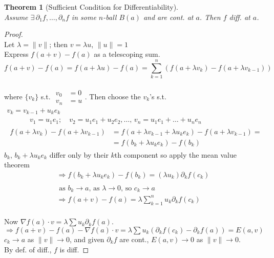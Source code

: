 \documentclass[twoside]{amsart}
\theoremstyle{plain}
\newtheorem{theorem}{Theorem}
\theoremstyle{definition}
\begin{document}
\begin{theorem}[Sufficient Condition for Differentiability] \quad \\
Assume $\exists \, \partial_1 f , \dots , \partial_n f$ in some $n$-ball $B(a)$ and are cont. at $a$.  Then $f$ diff. at $a$.  
\end{theorem}

\begin{proof} \quad \\
Let $\lambda = \| v \|$; then $v = \lambda u$, \quad $\| u \| = 1$ \\
Express $f(a+v) -f(a)$ as a telescoping sum.  
\[
f(a+v)-f(a) = f(a + \lambda u ) -f(a) = \sum_{k=1}^n \left( f(a+\lambda v_k) - f(a+\lambda v_{k-1}) \right) 
\]\quad \\
where $\{ v_k \}$ s.t. $\begin{aligned}
    v_0 & = 0 \\
    v_n & = u 
  \end{aligned}$.  Then choose the $v_k$'s s.t. 
\[
\begin{gathered}
  v_k = v_{k-1} + u_k e_k \\
 \quad \quad \quad \, v_1 = u_1 e_1; \quad v_2 = u_1 e_1 + u_2 e_2 , \dots , \, v_n = u_1 e_1 + \dots + u_n e_n  \\
  \begin{aligned}
f(a+\lambda v_k) - f(a+\lambda v_{k-1} )  & = f(a+ \lambda v_{k-1} + \lambda u_k e_k) - f(a+\lambda v_{k-1} ) = \\
& = f(b_k + \lambda u_k e_k) - f(b_k)
\end{aligned} 
\end{gathered}
\]
$b_k, \, b_k + \lambda u_k e_k$ differ only by their $k$th component so apply the mean value theorem 
\[
\begin{gathered}
  \Longrightarrow f(b_k + \lambda u_k e_k) - f(b_k) = (\lambda u_k) \partial_k f(c_k) \\
\quad \\
\text{ as $b_k \to a$, as $\lambda \to 0$, so $c_k \to a$ } \\
\Longrightarrow f(a+v) -f(a) = \lambda \sum_{k=1}^n u_k \partial_k f(c_k) 
\end{gathered}
\]
\quad \\
Now $\nabla f(a) \cdot v = \lambda \sum u_k \partial_k f(a) $.  \\
$\Longrightarrow f(a+v) -f(a) - \nabla f(a) \cdot v = \lambda \sum u_k (\partial_k f(c_k) - \partial_k f(a) ) = E(a,v)$ \medskip \\
$c_k \to a$ as $\| v \| \to 0$, and given $\partial_k f$ are cont., $E(a,v) \to 0$ as $\| v \| \to 0$.  \\
By def. of diff., $f$ is diff.  
\end{proof}
\end{document}
